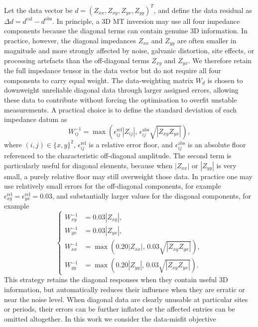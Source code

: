 \documentclass{article}
\begin{document}
Let the data vector be $d=(Z_{xx}, Z_{xy}, Z_{yx}, Z_{yy})^T$, and define the data residual as $\Delta d = d^{\mathrm{cal}} - d^{\mathrm{obs}}$. In principle, a 3D MT inversion may use all four impedance components because the diagonal terms can contain genuine 3D information. In practice, however, the diagonal impedances $Z_{xx}$ and $Z_{yy}$ are often smaller in magnitude and more strongly affected by noise, galvanic distortion, site effects, or processing artefacts than the off-diagonal terms $Z_{xy}$ and $Z_{yx}$. We therefore retain the full impedance tensor in the data vector but do not require all four components to carry equal weight. The data-weighting matrix $W_d$ is chosen to downweight unreliable diagonal data through larger assigned errors, allowing these data to contribute without forcing the optimisation to overfit unstable measurements. A practical choice is to define the standard deviation of each impedance datum as
\begin{equation}
W^{-1}_{ij}=\max\!\left(\epsilon^{\mathrm{rel}}_{ij}|Z_{ij}|,\,\epsilon^{\mathrm{abs}}_{ij}\sqrt{|Z_{xy}Z_{yx}|}\right),
\end{equation}
where $(i,j)\in\{x,y\}^2$, $\epsilon^{\mathrm{rel}}_{ij}$ is a relative error floor, and $\epsilon^{\mathrm{abs}}_{ij}$ is an absolute floor referenced to the characteristic off-diagonal amplitude. The second term is particularly useful for diagonal elements, because when $|Z_{xx}|$ or $|Z_{yy}|$ is very small, a purely relative floor may still overweight those data. In practice one may use relatively small errors for the off-diagonal components, for example $\epsilon^{\mathrm{rel}}_{xy}=\epsilon^{\mathrm{rel}}_{yx}=0.03$, and substantially larger values for the diagonal components, for example
\begin{equation}
  \left\{
\begin{aligned}
W^{-1}_{xy} &= 0.03|Z_{xy}|,\\
W^{-1}_{yx} &= 0.03|Z_{yx}|,\\
W^{-1}_{xx} &= \max\!\left(0.20|Z_{xx}|,\,0.03\sqrt{|Z_{xy}Z_{yx}|}\right),\\
W^{-1}_{yy} &= \max\!\left(0.20|Z_{yy}|,\,0.03\sqrt{|Z_{xy}Z_{yx}|}\right).
\end{aligned}
\right.
\end{equation}
This strategy retains the diagonal responses when they contain useful 3D information, but automatically reduces their influence when they are erratic or near the noise level. When diagonal data are clearly unusable at particular sites or periods, their errors can be further inflated or the affected entries can be omitted altogether. In this work we consider the data-misfit objective
\end{document}

